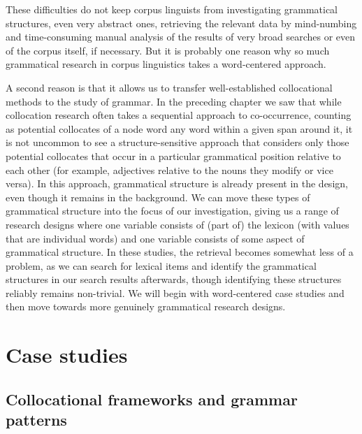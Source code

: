 These difficulties do not keep corpus linguists from investigating grammatical structures, even very abstract ones, retrieving the relevant data by mind\hyp{}numb\-ing and time\hyp{}consuming manual analysis of the results of very broad searches or even of the corpus itself, if necessary. But it is probably one reason why so much grammatical research in corpus linguistics takes a word-centered approach.

A second reason is that it allows us to transfer well-established collocational methods to the study of grammar. In the preceding chapter we saw that while collocation research often takes a sequential approach to co-occurrence, counting as potential collocates of a node word any word within a given span around it, it is not uncommon to see a structure-sensitive approach that considers only those potential collocates that occur in a particular grammatical position relative to each other (for example, adjectives relative to the nouns they modify or vice versa). In this approach, grammatical structure is already present in the design, even though it remains in the background. We can move these types of grammatical structure into the focus of our investigation, giving us a range of research designs where one variable consists of (part of) the lexicon (with values that are individual words) and one variable consists of some aspect of grammatical structure. In these studies, the retrieval becomes somewhat less of a problem, as we can search for lexical items and identify the grammatical structures in our search results afterwards, though identifying these structures reliably remains non-trivial. We will begin with word-centered case studies and then move towards more genuinely grammatical research designs.

\section{Case studies}
\label{sec:grammarcasestudies}

\subsection{Collocational frameworks and grammar patterns}
\label{sec:collocationalframeworksandgrammarpatterns}

